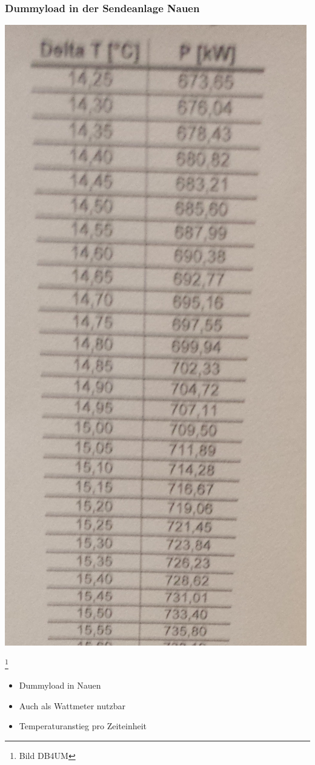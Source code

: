 \begin{frame}
    \frametitle{Dummyload in der Sendeanlage Nauen}
	\begin{minipage}{0.4\textwidth}
	\begin{center}
	    \includegraphics[width=.9\textwidth,height=.8\textheight,keepaspectratio]{e17/DummyNauen.jpg}
	\end{center}
	\end{minipage}
	        \footnote{\tiny Bild DB4UM}
	\begin{minipage}{0.55\textwidth}
	\begin{itemize}
		\item Dummyload in Nauen
		\item Auch als Wattmeter nutzbar
		\item Temperaturanstieg pro Zeiteinheit
	\end{itemize}
	\end{minipage}
\end{frame}

